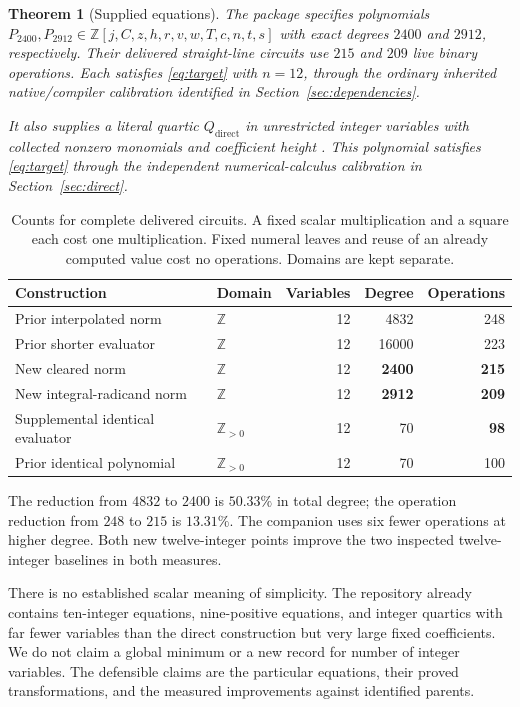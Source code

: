 \documentclass[11pt,a4paper]{article}
\newtheorem{theorem}{Theorem}[section]
\theoremstyle{remark}\newtheorem{remark}[theorem]{Remark}
\newcommand{\Z}{\mathbb Z}\newcommand{\Q}{\mathbb Q}\newcommand{\N}{\mathbb N}
\newcommand{\primary}{P_{2400}}\newcommand{\companion}{P_{2912}}
\begin{document}
\begin{theorem}[Supplied equations]\label{thm:main}
The package specifies polynomials $\primary,\companion\in
\Z[j,C,z,h,r,v,w,T,c,n,t,s]$ with exact degrees $2400$ and $2912$,
respectively. Their delivered straight-line circuits use $215$ and $209$
live binary operations. Each satisfies \eqref{eq:target} with $n=12$,
through the ordinary inherited native/compiler calibration identified in
Section~\ref{sec:dependencies}.

It also supplies a literal quartic $Q_{\mathrm{direct}}$ in
\DirectVariables{} unrestricted integer variables with
\DirectMonomials{} collected nonzero monomials and coefficient height
\DirectHeight{}. This polynomial satisfies \eqref{eq:target} through the
independent numerical-calculus calibration in Section~\ref{sec:direct}.
\end{theorem}

\begin{table}[ht]
\centering\small
\begin{tabular}{@{}llrrr@{}}
\toprule
Construction & Domain & Variables & Degree & Operations\\
\midrule
Prior interpolated norm & $\Z$ & 12 & 4832 & 248\\
Prior shorter evaluator & $\Z$ & 12 & 16000 & 223\\
New cleared norm & $\Z$ & 12 & \textbf{2400} & \textbf{215}\\
New integral-radicand norm & $\Z$ & 12 & \textbf{2912} & \textbf{209}\\
Supplemental identical evaluator & $\Z_{>0}$ & 12 & 70 & \textbf{98}\\
Prior identical polynomial & $\Z_{>0}$ & 12 & 70 & 100\\
\bottomrule
\end{tabular}
\caption{Counts for complete delivered circuits. A fixed scalar multiplication
and a square each cost one multiplication. Fixed numeral leaves and reuse
of an already computed value cost no operations. Domains are kept separate.}
\label{tab:main}
\end{table}

The reduction from $4832$ to $2400$ is $50.33\%$ in total degree; the
operation reduction from $248$ to $215$ is $13.31\%$. The companion uses
six fewer operations at higher degree. Both new twelve-integer points
improve the two inspected twelve-integer baselines in both measures.

There is no established scalar meaning of simplicity. The repository
already contains ten-integer equations, nine-positive equations, and
integer quartics with far fewer variables than the direct construction
but very large fixed coefficients. We do not claim a global minimum or a
new record for number of integer variables. The defensible claims are the
particular equations, their proved transformations, and the measured
improvements against identified parents.
\end{document}
